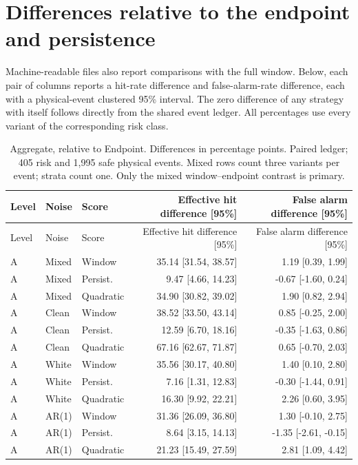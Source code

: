 \documentclass[10pt]{article}
\begin{document}
\section{Differences relative to the endpoint and persistence}
Machine-readable files also report comparisons with the full window. Below, each pair of columns reports a hit-rate difference and false-alarm-rate difference, each with a physical-event clustered 95\% interval. The zero difference of any strategy with itself follows directly from the shared event ledger. All percentages use every variant of the corresponding risk class.
\begingroup\small\setlength{\tabcolsep}{3.8pt}
\begin{longtable}{lllrr}
\caption{Aggregate, relative to Endpoint. Differences in percentage points. Paired ledger; 405 risk and 1,995 safe physical events. Mixed rows count three variants per event; strata count one. Only the mixed window--endpoint contrast is primary.}\\
\toprule Level & Noise & Score & Effective hit difference [95\%] & False alarm difference [95\%] \\\midrule\endfirsthead
\toprule Level & Noise & Score & Effective hit difference [95\%] & False alarm difference [95\%] \\\midrule\endhead
A & Mixed & Window & 35.14 [31.54, 38.57] & 1.19 [0.39, 1.99] \\
A & Mixed & Persist. & 9.47 [4.66, 14.23] & -0.67 [-1.60, 0.24] \\
A & Mixed & Quadratic & 34.90 [30.82, 39.02] & 1.90 [0.82, 2.94] \\
A & Clean & Window & 38.52 [33.50, 43.14] & 0.85 [-0.25, 2.00] \\
A & Clean & Persist. & 12.59 [6.70, 18.16] & -0.35 [-1.63, 0.86] \\
A & Clean & Quadratic & 67.16 [62.67, 71.87] & 0.65 [-0.70, 2.03] \\
A & White & Window & 35.56 [30.17, 40.80] & 1.40 [0.10, 2.80] \\
A & White & Persist. & 7.16 [1.31, 12.83] & -0.30 [-1.44, 0.91] \\
A & White & Quadratic & 16.30 [9.92, 22.21] & 2.26 [0.60, 3.95] \\
A & AR(1) & Window & 31.36 [26.09, 36.80] & 1.30 [-0.10, 2.75] \\
A & AR(1) & Persist. & 8.64 [3.15, 14.13] & -1.35 [-2.61, -0.15] \\
A & AR(1) & Quadratic & 21.23 [15.49, 27.59] & 2.81 [1.09, 4.42] \\
\bottomrule\end{longtable}\endgroup
\end{document}
